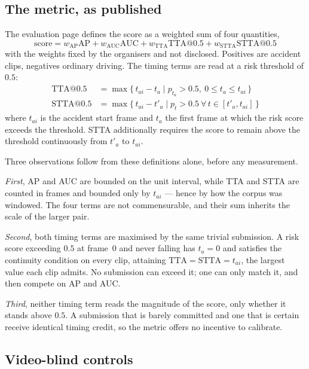 \subsection{The metric, as published}
\label{sec:metric}

The evaluation page defines the score as a weighted sum of four quantities,
\begin{equation}
\text{score} = w_{\text{AP}}\text{AP} + w_{\text{AUC}}\text{AUC}
 + w_{\text{TTA}}\text{TTA@0.5} + w_{\text{STTA}}\text{STTA@0.5}
\end{equation}
with the weights fixed by the organisers and not disclosed. Positives are
accident clips, negatives ordinary driving. The timing terms are read at a risk
threshold of $0.5$:
\begin{align}
\text{TTA@0.5} &= \max\{\, t_{ai} - t_a \mid p_{t_a} > 0.5,\ 0 \le t_a \le t_{ai} \,\} \\
\text{STTA@0.5} &= \max\{\, t_{ai} - t'_a \mid p_t > 0.5\ \forall\, t \in [t'_a, t_{ai}] \,\}
\end{align}
where $t_{ai}$ is the accident start frame and $t_a$ the first frame at which
the risk score exceeds the threshold. STTA additionally requires the score to
remain above the threshold continuously from $t'_a$ to $t_{ai}$.

Three observations follow from these definitions alone, before any measurement.

\emph{First}, AP and AUC are bounded on the unit interval, while TTA and STTA
are counted in frames and bounded only by $t_{ai}$ --- hence by how the corpus
was windowed. The four terms are not commensurable, and their sum inherits the
scale of the larger pair.

\emph{Second}, both timing terms are maximised by the same trivial submission.
A risk score exceeding $0.5$ at frame~0 and never falling has $t_a = 0$ and
satisfies the continuity condition on every clip, attaining
$\text{TTA} = \text{STTA} = t_{ai}$, the largest value each clip admits. No
submission can exceed it; one can only match it, and then compete on AP and
AUC.

\emph{Third}, neither timing term reads the magnitude of the score, only
whether it stands above $0.5$. A submission that is barely committed and one
that is certain receive identical timing credit, so the metric offers no
incentive to calibrate.

\subsection{Video-blind controls}
\label{sec:controls}

